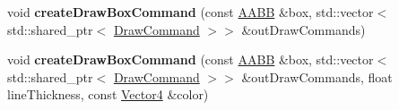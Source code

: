 \begin{Indent}
\begin{DoxyCompactItemize}
\item 
\mbox{\label{classrev_1_1_debug_manager_a3bbdc0f4ee467459fe3fe85e03951597}} 
void {\bfseries create\+Draw\+Box\+Command} (const \mbox{\hyperlink{classrev_1_1_a_a_b_b}{A\+A\+BB}} \&box, std\+::vector$<$ std\+::shared\+\_\+ptr$<$ \mbox{\hyperlink{classrev_1_1_draw_command}{Draw\+Command}} $>$$>$ \&out\+Draw\+Commands)
\item 
\mbox{\label{classrev_1_1_debug_manager_a676f9165c2c273d13e996d8d408bd2f3}} 
void {\bfseries create\+Draw\+Box\+Command} (const \mbox{\hyperlink{classrev_1_1_a_a_b_b}{A\+A\+BB}} \&box, std\+::vector$<$ std\+::shared\+\_\+ptr$<$ \mbox{\hyperlink{classrev_1_1_draw_command}{Draw\+Command}} $>$$>$ \&out\+Draw\+Commands, float line\+Thickness, const \mbox{\hyperlink{classrev_1_1_vector}{Vector4}} \&color)
\end{DoxyCompactItemize}
\end{Indent}
